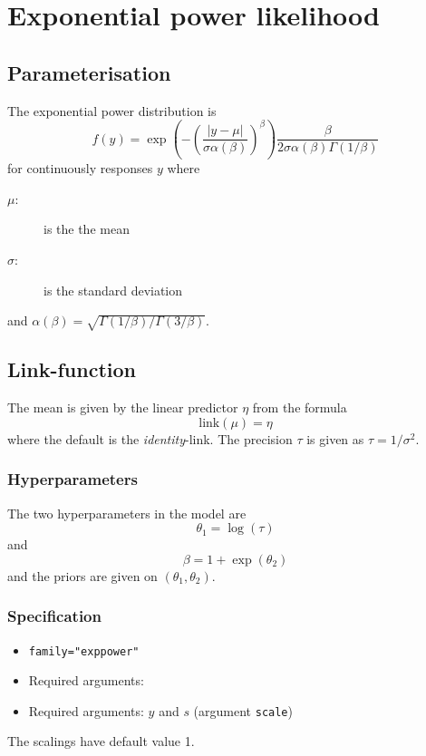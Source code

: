 \documentclass[a4paper,11pt]{article}
\begin{document}
\section*{Exponential power likelihood}

\subsection*{Parameterisation}

The exponential power distribution is
\begin{displaymath}
    f(y) = \exp\left( - \left( \frac{|y-\mu|}{\sigma\alpha(\beta)}\right)^{\beta}\right)
    \frac{\beta}{2\sigma\alpha(\beta) \Gamma(1/\beta)}
\end{displaymath}
for continuously responses $y$ where
\begin{description}
\item[$\mu$:] is the the mean
\item[$\sigma$:] is the standard deviation
\end{description}
and $\alpha(\beta) = \sqrt{\Gamma(1/\beta)/\Gamma(3/\beta)}$.

\subsection*{Link-function}

The mean is given by the linear predictor $\eta$ from the formula
\begin{displaymath}
    \text{link}(\mu) = \eta
\end{displaymath}
where the default is the \emph{identity}-link. The precision $\tau$ is given
as $\tau = 1/\sigma^{2}$.

\subsubsection*{Hyperparameters}
The two hyperparameters in the model are
\begin{displaymath}
    \theta_1=\log(\tau)
\end{displaymath}
and
\begin{displaymath}
    \beta = 1 + \exp(\theta_2)
\end{displaymath}
and the priors are given on $(\theta_1, \theta_2)$.


\subsubsection*{Specification}
\begin{itemize}
\item \texttt{family="exppower"}
\item Required arguments:
\item Required arguments: $y$ and $s$ (argument \texttt{scale})
\end{itemize}
The scalings have default value 1.
\end{document}
